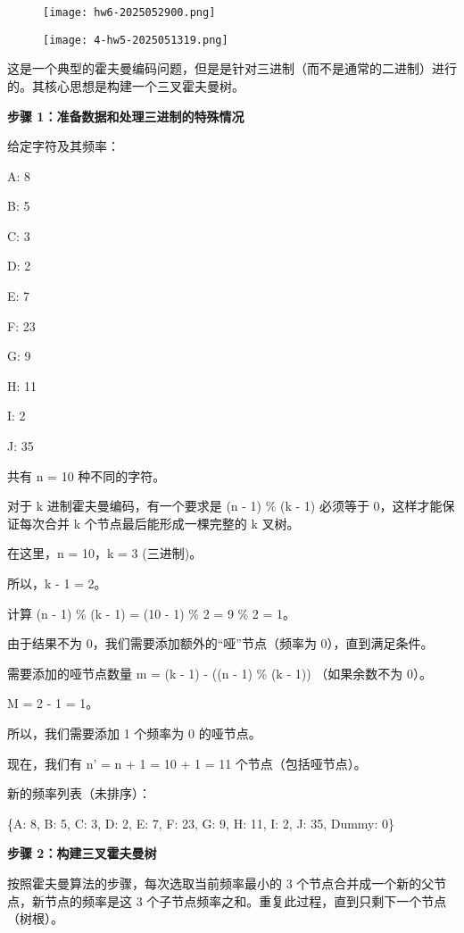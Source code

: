 \begin{figure}[H]
\centering
\texttt{[image: hw6-2025052900.png]}
\label{}
\end{figure}

\begin{figure}[H]
\centering
\texttt{[image: 4-hw5-2025051319.png]}
\label{}
\end{figure}

这是一个典型的霍夫曼编码问题，但是是针对三进制（而不是通常的二进制）进行的。其核心思想是构建一个三叉霍夫曼树。

\textbf{步骤 1：准备数据和处理三进制的特殊情况}

给定字符及其频率：

A: 8

B: 5

C: 3

D: 2

E: 7

F: 23

G: 9

H: 11

I: 2

J: 35

共有 n = 10 种不同的字符。

对于 k 进制霍夫曼编码，有一个要求是 (n - 1) \% (k - 1) 必须等于 0，这样才能保证每次合并 k 个节点最后能形成一棵完整的 k 叉树。

在这里，n = 10，k = 3 (三进制)。

所以，k - 1 = 2。

计算 (n - 1) \% (k - 1) = (10 - 1) \% 2 = 9 \% 2 = 1。

由于结果不为 0，我们需要添加额外的“哑”节点（频率为 0），直到满足条件。

需要添加的哑节点数量 m = (k - 1) - ((n - 1) \% (k - 1)) （如果余数不为 0）。

M = 2 - 1 = 1。

所以，我们需要添加 1 个频率为 0 的哑节点。

现在，我们有 n' = n + 1 = 10 + 1 = 11 个节点（包括哑节点）。

新的频率列表（未排序）：

\{A: 8, B: 5, C: 3, D: 2, E: 7, F: 23, G: 9, H: 11, I: 2, J: 35, Dummy: 0\}

\textbf{步骤 2：构建三叉霍夫曼树}

按照霍夫曼算法的步骤，每次选取当前频率最小的 3 个节点合并成一个新的父节点，新节点的频率是这 3 个子节点频率之和。重复此过程，直到只剩下一个节点（树根）。

